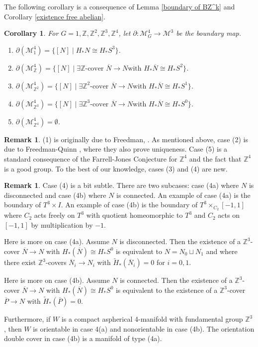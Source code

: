 \documentclass[12pt]{amsart}
\newtheorem{corollary}[theorem]{Corollary}
\theoremstyle{definition}
\newtheorem{remark}[theorem]{Remark}
\newcommand{\Z}{\mathbb Z}
\newcommand{\ol}[1]{{\overline{#1}}}
\newcommand{\wt}[1]{{\widetilde{#1}}}
\newcommand{\cM}{\mathcal M}
\begin{document}
The following corollary is a consequence of Lemma \ref{boundary of BZ^k} and Corollary \ref{existence free abelian}.

\begin{corollary} \label{boundaries_abelian}
For $G = 1, \Z, \Z^2, \Z^3, \Z^4$, let
$
\partial: \cM^4_G \to \cM^3
$
be the boundary map.
\begin{enumerate}
\item  $\partial(\cM^4_1) = \{ [N]  \mid H_* N \cong H_*S^3 \}$.
\item  $\partial(\cM^4_\Z) = \{ [N]  \mid \exists \Z\text{-cover } \ol N \to N \text{with }  H_*\ol N \cong H_*S^2\}$.
\item  $\partial(\cM^4_{\Z^2}) = \{ [N]  \mid \exists \Z^2\text{-cover } \ol N \to N \text{with }  H_*\ol N \cong H_*S^1\}$.
\item $\partial(\cM^4_{\Z^3}) = \{ [N]  \mid \exists \Z^3\text{-cover } \ol N \to N \text{with }  H_*\ol N \cong H_*S^0\}$.
\item $\partial(\cM^4_{\Z^4}) = \emptyset$.
\end{enumerate}
\end{corollary}

\begin{remark}
(1) is originally due to Freedman, \cite[Theorem 1.4']{Fr}.  As mentioned above, case (2) is due to Freedman-Quinn \cite[11.6A]{FQ}, where they also prove uniqueness.   Case (5) is a standard consequence of the Farrell-Jones Conjecture for $\Z^4$ and the fact that $\Z^4$ is a good group.   To the best of our knowledge, cases (3) and (4) are new.
\end{remark}



\begin{remark}
 Case (4) is a bit subtle.    There are two subcases: case (4a) where $N$ is disconnected and case (4b)  where $N$ is connected.   An example of case (4a) is the boundary of $T^3 \times I$.   An example of case (4b) is the boundary of $T^3 \times_{C_2} [-1,1]$ where $C_2$ acts freely on $T^3$ with quotient homeomorphic to $T^3$ and $C_2$ acts on $[-1,1]$ by multiplication by $-1$.   
 
Here is more on case (4a).   Assume $N$ is disconnected.   Then the existence of a $\Z^3$-cover $\ol N \to N$ with $H_*(\ol N) \cong H_*S^0$ is equivalent to $N = N_0 \sqcup N_1$ and where there exist $\Z^3$-covers $\ol N_i \to N_i$ with $\wt H_*(\ol N_i) = 0$  for $i = 0,1$.

Here is more on case (4b).   Assume $N$ is connected.   Then the existence of a $\Z^3$-cover $\ol N \to N$ with $H_*(\ol N) \cong H_*S^0$ is equivalent to the existence of a $\Z^3$-cover $\ol P \to N$ with $\wt H_*(\ol P) = 0$.

Furthermore, if $W$ is a compact aspherical 4-manifold with fundamental group $\Z^3$, then $W$ is orientable in case 4(a) and nonorientable in case (4b).   The orientation double cover in case (4b) is a manifold of type (4a).
\end{remark}
\end{document}

